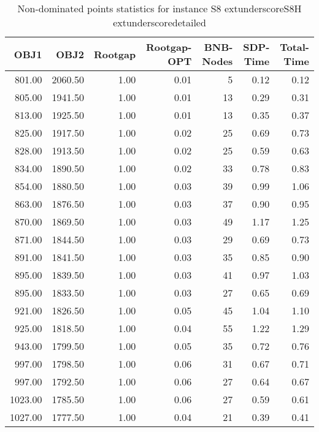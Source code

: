 \begin{table}
\caption{Non-dominated points statistics for instance S8	extunderscoreS8H	extunderscoredetailed}
\label{tab:plots/S8_S8H_detailed}
\begin{tabular}{rrrrrrr}
\toprule
OBJ1 & OBJ2 & Rootgap & Rootgap-OPT & BNB-Nodes & SDP-Time & Total-Time \\
\midrule
801.00 & 2060.50 & 1.00 & 0.01 & 5 & 0.12 & 0.12 \\
805.00 & 1941.50 & 1.00 & 0.01 & 13 & 0.29 & 0.31 \\
813.00 & 1925.50 & 1.00 & 0.01 & 13 & 0.35 & 0.37 \\
825.00 & 1917.50 & 1.00 & 0.02 & 25 & 0.69 & 0.73 \\
828.00 & 1913.50 & 1.00 & 0.02 & 25 & 0.59 & 0.63 \\
834.00 & 1890.50 & 1.00 & 0.02 & 33 & 0.78 & 0.83 \\
854.00 & 1880.50 & 1.00 & 0.03 & 39 & 0.99 & 1.06 \\
863.00 & 1876.50 & 1.00 & 0.03 & 37 & 0.90 & 0.95 \\
870.00 & 1869.50 & 1.00 & 0.03 & 49 & 1.17 & 1.25 \\
871.00 & 1844.50 & 1.00 & 0.03 & 29 & 0.69 & 0.73 \\
891.00 & 1841.50 & 1.00 & 0.03 & 35 & 0.85 & 0.90 \\
895.00 & 1839.50 & 1.00 & 0.03 & 41 & 0.97 & 1.03 \\
895.00 & 1833.50 & 1.00 & 0.03 & 27 & 0.65 & 0.69 \\
921.00 & 1826.50 & 1.00 & 0.05 & 45 & 1.04 & 1.10 \\
925.00 & 1818.50 & 1.00 & 0.04 & 55 & 1.22 & 1.29 \\
943.00 & 1799.50 & 1.00 & 0.05 & 35 & 0.72 & 0.76 \\
997.00 & 1798.50 & 1.00 & 0.06 & 31 & 0.67 & 0.71 \\
997.00 & 1792.50 & 1.00 & 0.06 & 27 & 0.64 & 0.67 \\
1023.00 & 1785.50 & 1.00 & 0.06 & 27 & 0.59 & 0.61 \\
1027.00 & 1777.50 & 1.00 & 0.04 & 21 & 0.39 & 0.41 \\
\bottomrule
\end{tabular}
\end{table}
